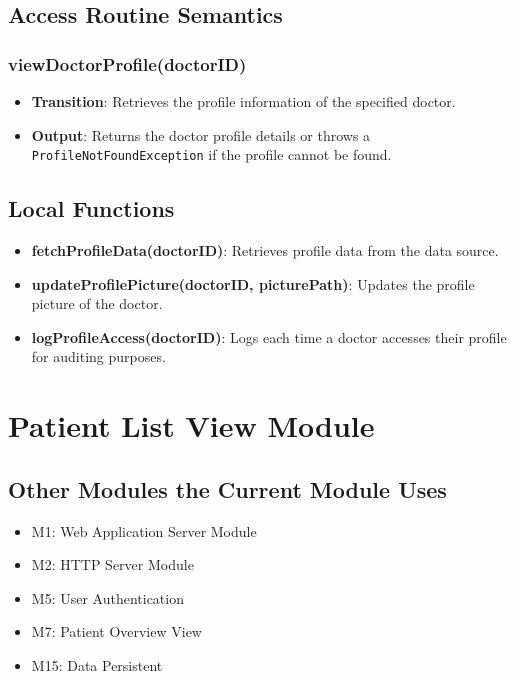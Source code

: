 \documentclass[12pt, titlepage]{article}
\begin{document}
\subsection{Access Routine Semantics}
\subsubsection{viewDoctorProfile(doctorID)}
\begin{itemize}
    \item \textbf{Transition}: Retrieves the profile information of the specified doctor.
    \item \textbf{Output}: Returns the doctor profile details or throws a \texttt{ProfileNotFoundException} if the profile cannot be found.
\end{itemize}


\subsection{Local Functions}
\begin{itemize}
\item \textbf{fetchProfileData(doctorID)}: Retrieves profile data from the data source.
\item \textbf{updateProfilePicture(doctorID, picturePath)}: Updates the profile picture of the doctor.
\item \textbf{logProfileAccess(doctorID)}: Logs each time a doctor accesses their profile for auditing purposes.
\end{itemize}

\section{Patient List View Module}

\subsection{Other Modules the Current Module Uses}
\begin{itemize}
    \item M1: Web Application Server Module
    \item M2: HTTP Server Module
    \item M5: User Authentication
    \item M7: Patient Overview View
    \item M15: Data Persistent
\end{itemize}
\end{document}
